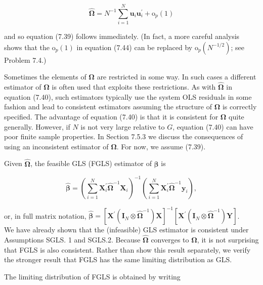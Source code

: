 \documentclass[10pt]{article}
\begin{document}
\begin{equation*}
\hat{\boldsymbol{\Omega}}=N^{-1} \sum_{i=1}^{N} \mathbf{u}_{i} \mathbf{u}_{i}^{\prime}+\mathrm{o}_{p}(1) \tag{7.44}
\end{equation*}


and so equation (7.39) follows immediately. (In fact, a more careful analysis shows that the $\mathrm{o}_{p}(1)$ in equation (7.44) can be replaced by $\mathrm{o}_{p}\left(N^{-1 / 2}\right)$; see Problem 7.4.)

Sometimes the elements of $\boldsymbol{\Omega}$ are restricted in some way. In such cases a different estimator of $\boldsymbol{\Omega}$ is often used that exploits these restrictions. As with $\hat{\boldsymbol{\Omega}}$ in equation (7.40), such estimators typically use the system OLS residuals in some fashion and lead to consistent estimators assuming the structure of $\boldsymbol{\Omega}$ is correctly specified. The advantage of equation (7.40) is that it is consistent for $\boldsymbol{\Omega}$ quite generally. However, if $N$ is not very large relative to $G$, equation (7.40) can have poor finite sample properties. In Section 7.5.3 we discuss the consequences of using an inconsistent estimator of $\boldsymbol{\Omega}$. For now, we assume (7.39).

Given $\hat{\boldsymbol{\Omega}}$, the feasible GLS (FGLS) estimator of $\boldsymbol{\beta}$ is


\begin{equation*}
\hat{\boldsymbol{\beta}}=\left(\sum_{i=1}^{N} \mathbf{X}_{i}^{\prime} \hat{\boldsymbol{\Omega}}^{-1} \mathbf{X}_{i}\right)^{-1}\left(\sum_{i=1}^{N} \mathbf{X}_{i}^{\prime} \hat{\boldsymbol{\Omega}}^{-1} \mathbf{y}_{i}\right), \tag{7.45}
\end{equation*}


or, in full matrix notation, $\hat{\boldsymbol{\beta}}=\left[\mathbf{X}^{\prime}\left(\mathbf{I}_{N} \otimes \hat{\boldsymbol{\Omega}}^{-1}\right) \mathbf{X}\right]^{-1}\left[\mathbf{X}^{\prime}\left(\mathbf{I}_{N} \otimes \hat{\boldsymbol{\Omega}}^{-1}\right) \mathbf{Y}\right]$.\\
We have already shown that the (infeasible) GLS estimator is consistent under Assumptions SGLS. 1 and SGLS.2. Because $\hat{\boldsymbol{\Omega}}$ converges to $\boldsymbol{\Omega}$, it is not surprising that FGLS is also consistent. Rather than show this result separately, we verify the stronger result that FGLS has the same limiting distribution as GLS.

The limiting distribution of FGLS is obtained by writing
\end{document}
